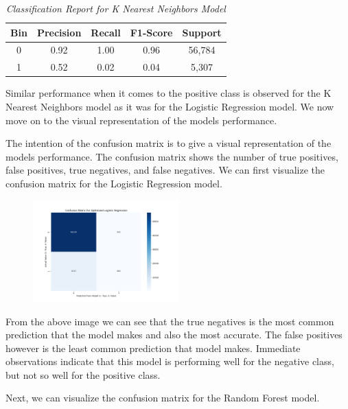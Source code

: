 \small{
    \begin{table}[h]
        \centering
        \begin{tabular}{|c|c|c|c|c|}
            \hline \textbf{Bin} & \textbf{Precision} & \textbf{Recall} & \textbf{F1-Score} & \textbf{Support} \\ \hline
            0 & 0.92 & 1.00 & 0.96 & 56,784 \\ \hline
            1 & 0.52 & 0.02 & 0.04 & 5,307 \\ \hline
        \end{tabular}
        \caption*{\textit{Classification Report for K Nearest Neighbors Model}}
    \end{table}
}

Similar performance when it comes to the positive class is observed for the K Nearest Neighbors model as it was for the Logistic Regression model. We now move on to the visual representation of the models performance.


The intention of the confusion matrix is to give a visual representation of the models performance. The confusion matrix shows the number of true positives, false positives, true negatives, and false negatives. 
We can first visualize the confusion matrix for the Logistic Regression model.

\begin{figure}[h]
    \centering
    \includegraphics[width=0.5\textwidth]{"Images/LR CM.png"}
\end{figure}

From the above image we can see that the true negatives is the most common prediction that the model makes and also the most accurate. The false positives however is the least common prediction that model makes. Immediate observations
indicate that this model is performing well for the negative class, but not so well for the positive class.

Next, we can visualize the confusion matrix for the Random Forest model.

